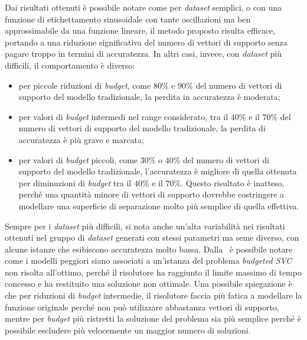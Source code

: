 Dai risultati ottenuti è possibile notare come per \emph{dataset} semplici, o con una funzione di etichettamento sinusoidale con tante oscillazioni ma ben approssimabile da una funzione lineare, il metodo proposto risulta efficace, portando a una riduzione significativa del numero di vettori di supporto senza pagare troppo in termini di accuratezza.
In altri casi, invece, con \emph{dataset} più difficili, il comportamento è diverso:
\begin{itemize}
    \item per piccole riduzioni di \emph{budget}, come $80\%$ e $90\%$ del numero di vettori di supporto del modello tradizionale, la perdita in accuratezza è moderata;
    \item per valori di \emph{budget} intermedi nel range considerato, tra il $40\%$ e il $70\%$ del numero di vettori di supporto del modello tradizionale, la perdita di accuratezza è più grave e marcata;
    \item per valori di \emph{budget} piccoli, come $30\%$ o $40\%$ del numero di vettori di supporto del modello tradizionale, l'accuratezza è migliore di quella ottenuta per diminuzioni di \emph{budget} tra il $40\%$ e il $70\%$.
    Questo risultato è inatteso, perché una quantità minore di vettori di supporto dovrebbe costringere a modellare una superficie di separazione molto più semplice di quella effettiva. 
\end{itemize}
Sempre per i \emph{dataset} più difficili, si nota anche un'alta variabilità nei risultati ottenuti nel gruppo di \emph{dataset} generati con stessi parametri ma seme diverso, con alcune istanze che esibiscono accuratezza molto bassa.
Dalla~ è possibile notare come i modelli peggiori siano associati a un'istanza del problema \emph{budgeted SVC} non risolta all'ottimo, perché il risolutore ha raggiunto il limite massimo di tempo concesso e ha restituito una soluzione non ottimale.
Una possibile spiegazione è che per riduzioni di \emph{budget} intermedie, il risolutore faccia più fatica a modellare la funzione originale perché non può utilizzare abbastanza vettori di supporto, mentre per \emph{budget} più ristretti la soluzione del problema sia più semplice perché è possibile escludere più velocemente un maggior numero di soluzioni.

